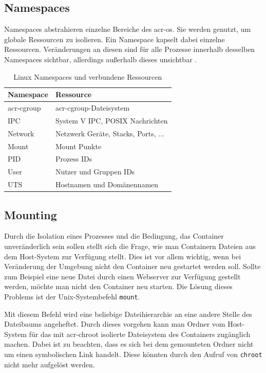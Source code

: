 \subsection{Namespaces}
\label{sec:namespaces}
Namespaces abstrahieren einzelne Bereiche des \gls{acr-os}. Sie werden genutzt, um globale Ressourcen zu isolieren. Ein Namespace kapselt dabei einzelne Ressourcen. Veränderungen an diesen sind für alle Prozesse innerhalb desselben Namespaces sichtbar, allerdings außerhalb dieses unsichtbar \citep{Namespaces7LinuxManualPage}.

\begin{table}[h]
	\begin{center}
		\begin{tabular}{ll}
			\toprule
			Namespace			& Ressource				 				\\
			\midrule
			\Gls{acr-cgroup}	& \Gls{acr-cgroup}-Dateisystem 			\\
			IPC					& System V IPC, POSIX Nachrichten 		\\
			Network				& Netzwerk Geräte, Stacks, Ports, ...	\\
			Mount				& Mount Punkte							\\
			PID					& Prozess IDs							\\
			User				& Nutzer und Gruppen IDs				\\
			UTS					& Hostnamen und Domänennamen			\\
			\bottomrule
		\end{tabular}
	\end{center}
	\caption{Linux Namespaces und verbundene Ressourcen \citep{Namespaces7LinuxManualPage}}
	\label{tab:namespaces}
\end{table}

\subsection{Mounting}
\label{sec:mount}
Durch die Isolation eines Prozesses und die Bedingung, das Container unveränderlich sein sollen stellt sich die Frage, wie man Containern Dateien aus dem Host-System zur Verfügung stellt. Dies ist vor allem wichtig, wenn bei Veränderung der Umgebung nicht den Container neu gestartet werden soll. Sollte zum Beispiel eine neue Datei durch einen Webserver zur Verfügung gestellt werden, möchte man nicht den Container neu starten. Die Lösung dieses Problems ist der Unix-Systembefehl \texttt{mount}. 

Mit diesem Befehl wird eine beliebige Dateihierarchie an eine andere Stelle des Dateibaums angeheftet. Durch dieses vorgehen kann man Ordner vom Host-System  für das mit \gls{acr-chroot} isolierte Dateisystem des Containers zugänglich machen. Dabei ist zu beachten, dass es sich bei dem gemounteten Ordner nicht um einen symbolischen Link handelt. Diese könnten durch den Aufruf von \texttt{chroot} nicht mehr aufgelöst werden.

